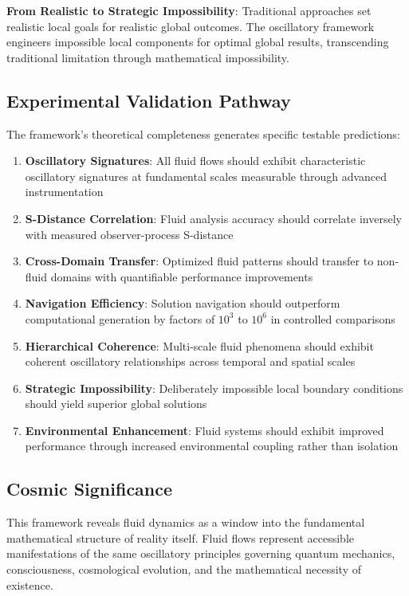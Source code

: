 \documentclass[12pt,a4paper]{article}
\begin{document}
\textbf{From Realistic to Strategic Impossibility}:
Traditional approaches set realistic local goals for realistic global outcomes. The oscillatory framework engineers impossible local components for optimal global results, transcending traditional limitation through mathematical impossibility.

\subsection{Experimental Validation Pathway}

The framework's theoretical completeness generates specific testable predictions:

\begin{enumerate}
\item \textbf{Oscillatory Signatures}: All fluid flows should exhibit characteristic oscillatory signatures at fundamental scales measurable through advanced instrumentation
\item \textbf{S-Distance Correlation}: Fluid analysis accuracy should correlate inversely with measured observer-process S-distance
\item \textbf{Cross-Domain Transfer}: Optimized fluid patterns should transfer to non-fluid domains with quantifiable performance improvements
\item \textbf{Navigation Efficiency}: Solution navigation should outperform computational generation by factors of $10^3$ to $10^6$ in controlled comparisons
\item \textbf{Hierarchical Coherence}: Multi-scale fluid phenomena should exhibit coherent oscillatory relationships across temporal and spatial scales
\item \textbf{Strategic Impossibility}: Deliberately impossible local boundary conditions should yield superior global solutions
\item \textbf{Environmental Enhancement}: Fluid systems should exhibit improved performance through increased environmental coupling rather than isolation
\end{enumerate}

\subsection{Cosmic Significance}

This framework reveals fluid dynamics as a window into the fundamental mathematical structure of reality itself. Fluid flows represent accessible manifestations of the same oscillatory principles governing quantum mechanics, consciousness, cosmological evolution, and the mathematical necessity of existence.
\end{document}
